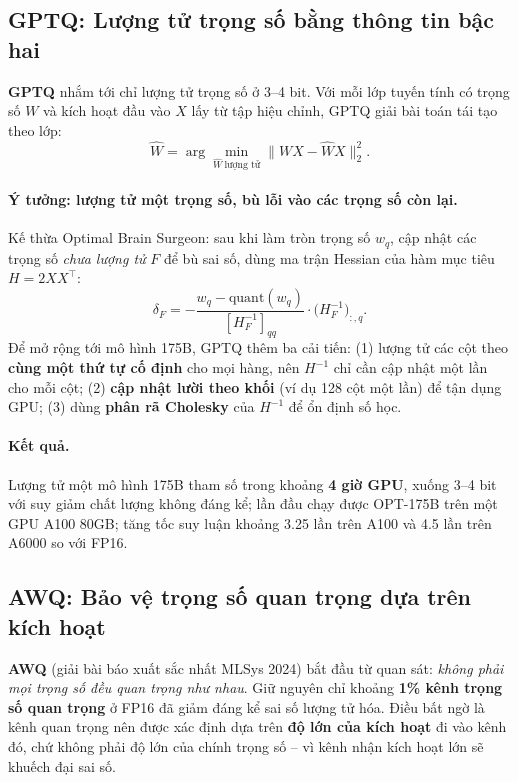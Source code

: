 \subsection{GPTQ: Lượng tử trọng số bằng thông tin bậc hai}
\label{ssec:gptq}
\textbf{GPTQ} \cite{frantar2023gptq} nhắm tới chỉ lượng tử trọng số ở 3--4 bit. Với mỗi lớp tuyến tính có trọng số $W$ và kích hoạt đầu vào $X$ lấy từ tập hiệu chỉnh, GPTQ giải bài toán tái tạo theo lớp:
\[
\hat{W} = \arg\min_{\hat{W}\ \text{lượng tử}} \big\|WX - \hat{W}X\big\|_2^2 .
\]
\paragraph{Ý tưởng: lượng tử một trọng số, bù lỗi vào các trọng số còn lại.} Kế thừa Optimal Brain Surgeon: sau khi làm tròn trọng số $w_q$, cập nhật các trọng số \emph{chưa lượng tử} $F$ để bù sai số, dùng ma trận Hessian của hàm mục tiêu $H = 2XX^\top$:
\[
\delta_F = -\frac{w_q - \text{quant}(w_q)}{[H_F^{-1}]_{qq}} \cdot \big(H_F^{-1}\big)_{:,q}.
\]
Để mở rộng tới mô hình 175B, GPTQ thêm ba cải tiến: (1) lượng tử các cột theo \textbf{cùng một thứ tự cố định} cho mọi hàng, nên $H^{-1}$ chỉ cần cập nhật một lần cho mỗi cột; (2) \textbf{cập nhật lười theo khối} (ví dụ 128 cột một lần) để tận dụng GPU; (3) dùng \textbf{phân rã Cholesky} của $H^{-1}$ để ổn định số học.
\paragraph{Kết quả.} Lượng tử một mô hình 175B tham số trong khoảng \textbf{4 giờ GPU}, xuống 3--4 bit với suy giảm chất lượng không đáng kể; lần đầu chạy được OPT-175B trên một GPU A100 80GB; tăng tốc suy luận khoảng 3.25 lần trên A100 và 4.5 lần trên A6000 so với FP16.

\subsection{AWQ: Bảo vệ trọng số quan trọng dựa trên kích hoạt}
\label{ssec:awq}
\textbf{AWQ} \cite{lin2024awq} (giải bài báo xuất sắc nhất MLSys 2024) bắt đầu từ quan sát: \emph{không phải mọi trọng số đều quan trọng như nhau}. Giữ nguyên chỉ khoảng \textbf{1\% kênh trọng số quan trọng} ở FP16 đã giảm đáng kể sai số lượng tử hóa. Điều bất ngờ là kênh quan trọng nên được xác định dựa trên \textbf{độ lớn của kích hoạt} đi vào kênh đó, chứ không phải độ lớn của chính trọng số -- vì kênh nhận kích hoạt lớn sẽ khuếch đại sai số.

